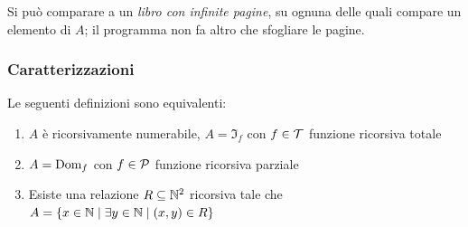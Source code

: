 Si può comparare a un \textit{libro con infinite pagine}, su ognuna delle quali compare un elemento di $A$; il programma non fa altro che sfogliare le pagine. 

\subsubsection{Caratterizzazioni}

\begin{theor}
	Le seguenti definizioni sono equivalenti:
	\begin{enumerate}
		\item $A$ è ricorsivamente numerabile, $A = \Im_f$ con $f \in \mathcal{T}$ funzione ricorsiva totale
		\item $A = \text{Dom}_f$ con $f \in \mathcal{P}$ funzione ricorsiva parziale
		\item Esiste una relazione $R \subseteq \mathbb{N}^2$ ricorsiva tale che $A = \left\{x \in \mathbb{N} \mid \exists y \in \mathbb{N} \mid (x,y) \in R \right\}$
	\end{enumerate}
\end{theor}
